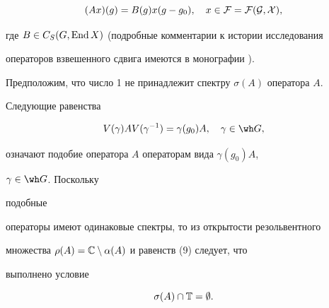 $$ 


(Ax)(g)=B(g)x(g-g_0),\quad x\in\cal F=\cal F(G,X), 


$$ 


где $B\in C_S(G,\operatorname{End} X)$ (подробные комментарии к истории исследования 


операторов взвешенного сдвига имеются в монографии \cite{Ant}). 


 


Предположим, что число 1 не принадлежит спектру $\sigma(A)$ оператора $A$. 


Следующие равенства 


\begin{equation} 


V(\gamma)AV(\gamma^{-1})=\gamma(g_0)A,\quad \gamma\in\wh G,


\end{equation} 


означают подобие оператора $A$ операторам вида $\gamma(g_0)A$, 


$\gamma\in\wh G$. Поскольку 


подобные 


операторы имеют одинаковые спектры, то из открытости резольвентного 


множества $\rho(A)=\Bbb C\setminus\alpha(A)$ и равенств (9) следует, что 


выполнено условие 


\begin{equation} 


\sigma(A)\cap\Bbb T=\emptyset. 


\end{equation} 


 


